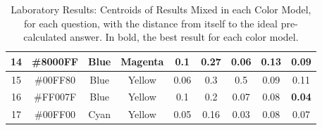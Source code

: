 \begin{table}[!htbp]
{\begin{tabular}{@{}ccccccccc@{}}
    \multicolumn{1}{|c|}{14} & \multicolumn{1}{c|}{\cellcolor[HTML]{8000FF}\#8000FF} & \multicolumn{1}{c|}{Blue}    & \multicolumn{1}{c||}{Magenta} & \multicolumn{1}{c|}{0.1}           & \multicolumn{1}{c|}{0.27}         & \multicolumn{1}{c|}{0.06}          & \multicolumn{1}{c|}{0.13}          & \multicolumn{1}{c|}{0.09}          \\ \midrule
    \multicolumn{1}{|c|}{15} & \multicolumn{1}{c|}{\cellcolor[HTML]{00FF80}\#00FF80} & \multicolumn{1}{c|}{Blue}    & \multicolumn{1}{c||}{Yellow}  & \multicolumn{1}{c|}{0.06}          & \multicolumn{1}{c|}{0.3}          & \multicolumn{1}{c|}{0.5}           & \multicolumn{1}{c|}{0.09}          & \multicolumn{1}{c|}{0.11}          \\ \midrule
    \multicolumn{1}{|c|}{16} & \multicolumn{1}{c|}{\cellcolor[HTML]{FF007F}\#FF007F} & \multicolumn{1}{c|}{Blue}    & \multicolumn{1}{c||}{Yellow}  & \multicolumn{1}{c|}{0.1}           & \multicolumn{1}{c|}{0.2}          & \multicolumn{1}{c|}{0.07}          & \multicolumn{1}{c|}{0.08}          & \multicolumn{1}{c|}{\textbf{0.04}} \\ \midrule
    \multicolumn{1}{|c|}{17} & \multicolumn{1}{c|}{\cellcolor[HTML]{00FF00}\#00FF00} & \multicolumn{1}{c|}{Cyan}    & \multicolumn{1}{c||}{Yellow}  & \multicolumn{1}{c|}{0.05}          & \multicolumn{1}{c|}{0.16}         & \multicolumn{1}{c|}{0.03}          & \multicolumn{1}{c|}{0.08}          & \multicolumn{1}{c|}{0.07}          \\ \bottomrule
    \end{tabular}}
  \caption[Laboratory Results: Centroids of Results Mixed in each Color Model]{Laboratory Results: Centroids of Results Mixed in each Color Model, for each question, with the distance from itself to the ideal pre-calculated answer. In bold, the best result for each color model.}
  \label{table:colormodels_centroids}
\end{table}
%

